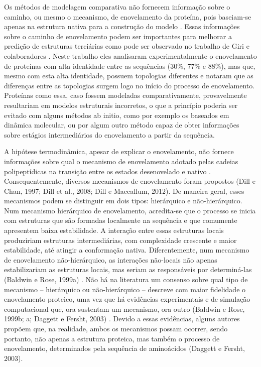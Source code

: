 Os métodos de modelagem comparativa não fornecem informação sobre o caminho, ou mesmo o mecanismo, de enovelamento da proteína, pois baseiam-se apenas na estrutura nativa para a construção do modelo \cite{Helles:2003}. Essas informações sobre o caminho de enovelamento podem ser importantes para melhorar a predição de estruturas terciárias como pode ser observado no trabalho de Giri e colaboradores \cite{Giri:2007}. Neste trabalho eles analisaram experimentalmente o enovelamento de proteínas com alta identidade entre as sequências (30\%, 77\% e 88\%), mas que, mesmo com esta alta identidade, possuem topologias diferentes e notaram que as diferenças entre as topologias surgem logo no início do processo de enovelamento. Proteínas como essa, caso fossem modeladas comparativamente, provavelmente resultariam em modelos estruturais incorretos, o que a princípio poderia ser evitado com alguns métodos ab initio, como por exemplo os baseados em dinâmica molecular, ou por algum outro método capaz de obter informações sobre estágios intermediários do enovelamento a partir da sequência.

A hipótese termodinâmica, apesar de explicar o enovelamento, não fornece informações sobre qual o mecanismo de enovelamento adotado pelas cadeias polipeptídicas na transição entre os estados desenovelado e nativo \cite{Rose:2001}. Consequentemente, diversos mecanismos de enovelamento foram propostos (Dill e Chan, 1997; Dill et al., 2008; Dill e Maccallum, 2012). De maneira geral, esses mecanismos podem se distinguir em dois tipos: hierárquico e não-hierárquico. Num mecanismo hierárquico de enovelamento, acredita-se que o processo se inicia com estruturas que são formadas localmente na sequência e que comumente apresentem baixa estabilidade. A interação entre essas estruturas locais produziriam estruturas intermediárias, com complexidade crescente e maior estabilidade, até atingir a conformação nativa. Diferentemente, num mecanismo de enovelamento não-hierárquico, as interações não-locais não apenas estabilizariam as estruturas locais, mas seriam as responsáveis por determiná-las (Baldwin e Rose, 1999a)⁠ . Não há na literatura um consenso sobre qual tipo de mecanismo – hierárquico ou não-hierárquico – descreve com maior fidelidade o enovelamento proteico, uma vez que há evidências experimentais e de simulação computacional que, ora sustentam um mecanismo, ora outro (Baldwin e Rose, 1999b; a; Daggett e Fersht, 2003)⁠ . Devido a essas evidências, alguns autores propõem que, na realidade, ambos os mecanismos possam ocorrer, sendo portanto, não apenas a estrutura proteica, mas também o processo de enovelamento, determinados pela sequência de aminoácidos (Daggett e Fersht, 2003)⁠. 

